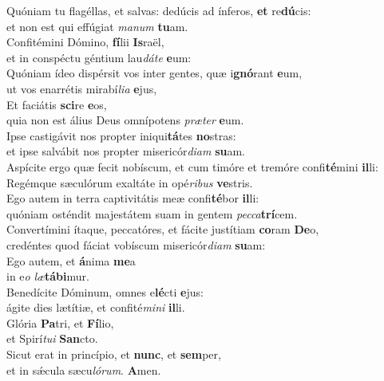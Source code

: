 \evenverse Quóniam tu flagéllas, et salvas: dedúcis ad ínferos, \textbf{et} re\textbf{dú}cis:~\*\\
\evenverse et non est qui effúgiat \textit{ma}\textit{num} \textbf{tu}am.\\
\oddverse Confitémini Dómino, \textbf{fí}lii \textbf{Is}raël,~\*\\
\oddverse et in conspéctu géntium lau\textit{dá}\textit{te} \textbf{e}um:\\
\evenverse Quóniam ídeo dispérsit vos inter gentes, quæ i\textbf{gnó}rant \textbf{e}um,~\*\\
\evenverse ut vos enarrétis mirabí\textit{li}\textit{a} \textbf{e}jus,\\
\oddverse Et faciátis \textbf{sci}re \textbf{e}os,~\*\\
\oddverse quia non est álius Deus omnípotens \textit{præ}\textit{ter} \textbf{e}um.\\
\evenverse Ipse castigávit nos propter iniqui\textbf{tá}tes \textbf{no}stras:~\*\\
\evenverse et ipse salvábit nos propter misericór\textit{di}\textit{am} \textbf{su}am.\\
\oddverse Aspícite ergo quæ fecit nobíscum, et cum timóre et tremóre confi\textbf{té}mini \textbf{il}li:~\*\\
\oddverse Regémque sæculórum exaltáte in opé\textit{ri}\textit{bus} \textbf{ve}stris.\\
\evenverse Ego autem in terra captivitátis meæ confi\textbf{té}bor \textbf{il}li:~\*\\
\evenverse quóniam osténdit majestátem suam in gentem \textit{pec}\textit{ca}\textbf{trí}cem.\\
\oddverse Convertímini ítaque, peccatóres, et fácite justítiam \textbf{co}ram \textbf{De}o,~\*\\
\oddverse credéntes quod fáciat vobíscum misericór\textit{di}\textit{am} \textbf{su}am:\\
\evenverse Ego autem, et \textbf{á}nima \textbf{me}a~\*\\
\evenverse in e\textit{o} \textit{læ}\textbf{tá}\textbf{bi}mur.\\
\oddverse Benedícite Dóminum, omnes e\textbf{lé}cti \textbf{e}jus:~\*\\
\oddverse ágite dies lætítiæ, et confité\textit{mi}\textit{ni} \textbf{il}li.\\
\evenverse Glória \textbf{Pa}tri, et \textbf{Fí}lio,~\*\\
\evenverse et Spirí\textit{tu}\textit{i} \textbf{San}cto.\\
\oddverse Sicut erat in princípio, et \textbf{nunc}, et \textbf{sem}per,~\*\\
\oddverse et in sǽcula sæcu\textit{ló}\textit{rum}. \textbf{A}men.\\
